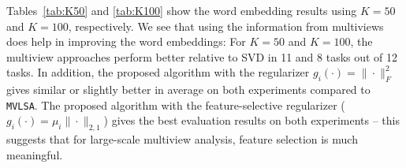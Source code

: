 \documentclass[10pt,journal]{IEEEtran}
\begin{document}
Tables~\ref{tab:K50} and \ref{tab:K100} show the word embedding results using $K=50$ and $K=100$, respectively.
We see that using the information from multiviews does help in improving the word embeddings:
For $K=50$ and $K=100$, the multiview approaches perform better relative to SVD in 11 and 8 tasks out of 12 tasks. 
In addition, the proposed algorithm with the regularizer $g_i(\cdot)=\|\cdot\|_F^2$ gives similar or slightly better in average on both experiments compared to \texttt{MVLSA}.
The proposed algorithm with the feature-selective regularizer ($g_i(\cdot)=\mu_i\|\cdot\|_{2,1}$) gives the best evaluation results on both experiments -- this suggests that for large-scale multiview analysis, feature selection is much meaningful.


\begin{table}[htbp]
  \centering
  \caption{Evaluation on 12 word embedding tasks; $K=50$.}
  \label{tab:K50}%
\end{table}%
\end{document}
